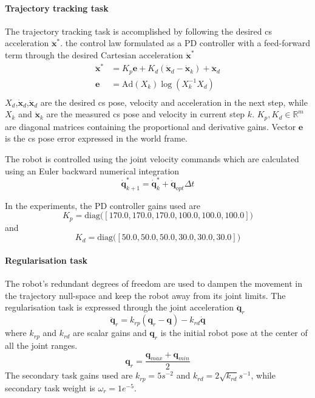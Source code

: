 \paragraph*{Trajectory tracking task} The trajectory tracking task is accomplished by following the desired \gls{cs} acceleration $\ddot{\bm{x}}^*$. the control law formulated as a PD controller with a feed-forward term through the desired Cartesian acceleration $\ddot{\bm{x}}^*$
\begin{equation}
\begin{split}
    \ddot{\bm{x}}^* &= K_p \bm{e} + K_d(\dot{\bm{x}}_{d} - \dot{\bm{x}}_k) + \ddot{\bm{x}}_{d} \\
    \bm{e} &= \text{Ad}(X_k) \log(X_k^{-1}X_{d})\\
\end{split}
\end{equation}
$X_d$,$\dot{\bm{x}}_d$,$\ddot{\bm{x}}_d$ are the desired \gls{cs} pose, velocity and acceleration in the next step, while $X_{k}$ and $\dot{\bm{x}}_{k}$ are the measured \gls{cs} pose and velocity in current step $k$. $K_p,K_d\in \mathbb{R}^m$ are diagonal matrices containing the proportional and derivative gains. Vector $\bm{e}$ is the \gls{cs} pose error expressed in the world frame. 

The robot is controlled using the joint velocity commands which are calculated using an Euler backward numerical integration
\begin{equation}
\dot{\bm{q}}^*_{k+1} = \dot{\bm{q}}^*_{k} +  \ddot{\bm{q}}_{opt}\Delta t  
\end{equation}

In the experiments, the PD controller gains used are $$K_p=\text{diag}\big([170.0, 170.0, 170.0, 100.0, 100.0, 100.0]\big)$$ and $$K_d=\text{diag}\big([50.0, 50.0, 50.0, 30.0, 30.0, 30.0]\big)$$

\paragraph*{Regularisation task}  The robot's redundant degrees of freedom are used to dampen the movement in the trajectory null-space and keep the robot away from its joint limits. The regularisation task is expressed through the joint acceleration $\ddot{\bm{q}}_r$
\begin{equation}
    \ddot{\bm{q}}_r = k_{rp}(\bm{q}_{r} - \bm{q}) - k_{rd}\dot{\bm{q}}
\end{equation}
where $k_{rp}$ and $k_{rd}$ are scalar gains and $\bm{q}_{r}$ is the initial robot pose at the center of all the joint ranges.
$$
\bm{q}_r = \frac{\bm{q}_{max}+\bm{q}_{min}}{2}
$$
The secondary task gains used are $k_{rp}=5 s^{-2}$ and $k_{rd}=2\sqrt{k_{rd}}s^{-1}$, while secondary task weight is $\omega_r=1e^{-5}$.


